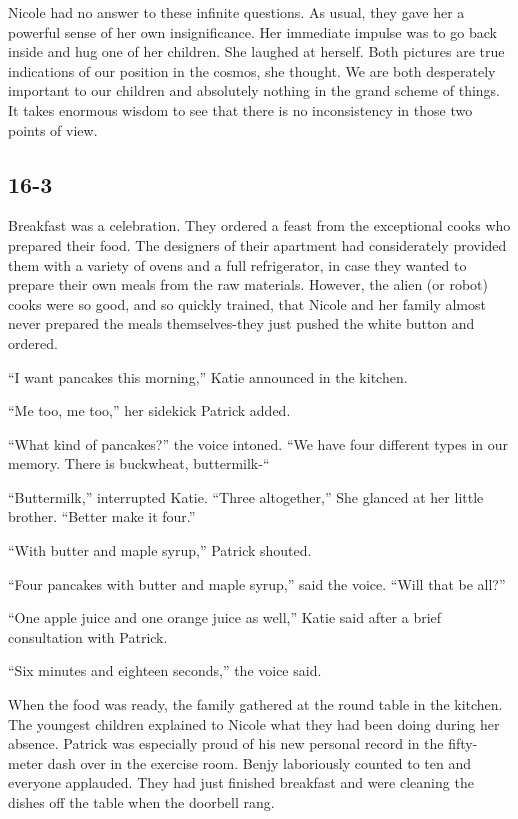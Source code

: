 \documentclass[]{article}
\begin{document}
{Nicole had no answer to these infinite questions. As usual, they gave her a powerful sense of her own insignificance. Her immediate impulse was to go back inside and hug one of her children. She laughed at herself. Both pictures are true indications of our position in the cosmos, she thought. We are both desperately important to our children and absolutely nothing in the grand scheme of things. It takes enormous wisdom to see that there is no inconsistency in those two points of view.

\subsection{16-3}

Breakfast was a celebration. They ordered a feast from the exceptional cooks who prepared their food. The designers of their apartment had considerately provided them with a variety of ovens and a full refrigerator, in case they wanted to prepare their own meals from the raw materials. However, the alien (or robot) cooks were so good, and so quickly trained, that Nicole and her family almost never prepared the meals themselves-they just pushed the white button and ordered.

“I want pancakes this morning,” Katie announced in the kitchen.

“Me too, me too,” her sidekick Patrick added.

“What kind of pancakes?” the voice intoned. “We have four different types in our memory. There is buckwheat, buttermilk-“

“Buttermilk,” interrupted Katie. “Three altogether,” She glanced at her little brother. “Better make it four.”

“With butter and maple syrup,” Patrick shouted.

“Four pancakes with butter and maple syrup,” said the voice. “Will that be all?”

“One apple juice and one orange juice as well,” Katie said after a brief consultation with Patrick.

“Six minutes and eighteen seconds,” the voice said.

When the food was ready, the family gathered at the round table in the kitchen. The youngest children explained to Nicole what they had been doing during her absence. Patrick was especially proud of his new personal record in the fifty-meter dash over in the exercise room. Benjy laboriously counted to ten and everyone applauded. They had just finished breakfast and were cleaning the dishes off the table when the doorbell rang.

}
\end{document}
